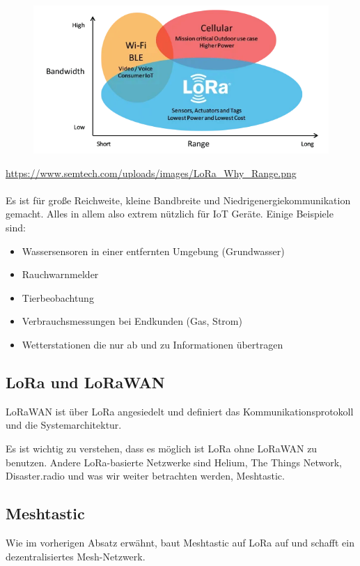 \documentclass[12pt,a4paper]{article}
\begin{document}
\begin{figure}[h]
	\includegraphics[scale=0.7]{./Bilder/Technologie/bandwidth-vs-range.png}
\end{figure}
\url{https://www.semtech.com/uploads/images/LoRa_Why_Range.png}\\ \\
Es ist für große Reichweite, kleine Bandbreite und Niedrigenergiekommunikation gemacht. Alles in allem also extrem nützlich für IoT Geräte.
Einige Beispiele sind:

\begin{itemize}
	\item Wassersensoren in einer entfernten Umgebung (Grundwasser)
	\item Rauchwarnmelder
	\item Tierbeobachtung
	\item Verbrauchsmessungen bei Endkunden (Gas, Strom)
	\item Wetterstationen die nur ab und zu Informationen übertragen
\end{itemize}
\newpage
\subsection{LoRa und LoRaWAN}

LoRaWAN ist über LoRa angesiedelt und definiert das Kommunikationsprotokoll und die Systemarchitektur.

Es ist wichtig zu verstehen, dass es möglich ist LoRa ohne LoRaWAN zu benutzen. Andere LoRa-basierte Netzwerke sind Helium,
The Things Network, Disaster.radio und was wir weiter betrachten werden, Meshtastic.

\subsection{Meshtastic}
Wie im vorherigen Absatz erwähnt, baut Meshtastic auf LoRa auf und schafft ein dezentralisiertes Mesh-Netzwerk.
\end{document}
